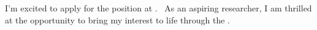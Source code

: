 



I'm excited to apply for the \position\;position at \company.
\areaofinterest\, 
As an aspiring researcher, 
I am thrilled at the opportunity 
to bring my interest to life through the \company.